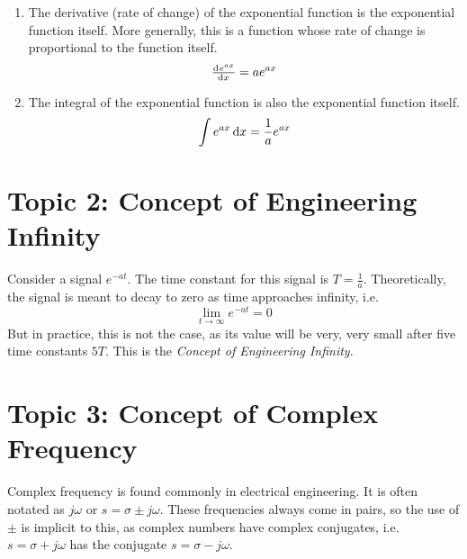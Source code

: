 \documentclass[a4paper,12pt]{report}
\begin{document}
\begin{enumerate}
    \item The derivative (rate of change) of the exponential function is the exponential function itself. More generally, this is a function whose rate of change is proportional to the function itself.
          \[
              \od{e^{ax}}{x} = ae^{ax}
          \]
    \item The integral of the exponential function is also the exponential function itself.
          \[
              \int e^{ax} \dif x = \frac{1}{a}e^{ax}
          \]
\end{enumerate}

\section{Topic 2: Concept of Engineering Infinity}
Consider a signal \(e^{-at}\). The time constant for this signal is \(T = \frac{1}{a}\). Theoretically, the signal is meant to decay to zero as time approaches infinity, i.e.
\[ 
    \lim_{t \to \infty} e^{-at} = 0 
\]
But in practice, this is not the case, as its value will be very, very small after five time constants \(5T\). This is the \emph{Concept of Engineering Infinity}.

\section{Topic 3: Concept of Complex Frequency}
Complex frequency is found commonly in electrical engineering. It is often notated as \( j\omega \) or \( s = \sigma \pm j \omega \). These frequencies always come in pairs, so the use of \( \pm \) is implicit to this, as complex numbers have complex conjugates, i.e.
\(s = \sigma + j \omega \) has the conjugate \(s = \sigma - j\omega \).
\end{document}
